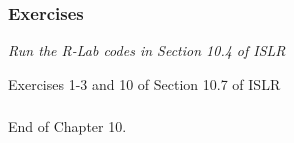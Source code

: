 \documentclass{beamer}
\begin{document}
                       
               
               
 
                      
      		\begin{frame}
      			\frametitle{Exercises  }
      			
      			
      			{\sl  Run the R-Lab codes in Section 10.4 of ISLR
      				
      				Exercises 1-3  and 10 of Section  10.7 of ISLR 
      			}
      			
   
      		\end{frame}
      		
      			\begin{frame}
      				\frametitle{  }
      				
      				
      				
      				End of Chapter 10. 
      				
      				
      			\end{frame}
      
    
\end{document}
